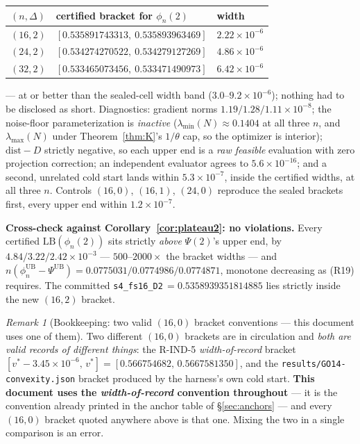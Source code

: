 \documentclass[11pt]{article}
\theoremstyle{definition}
\theoremstyle{remark}
\newtheorem{remark}{Remark}
\begin{document}
\begin{center}
\begin{tabular}{lll}
$(n,\Delta)$ & certified bracket for $\phi_n(2)$ & width\\
\hline
$(16,2)$ & $[0.535891743313,\ 0.535893963469]$ & $2.22\times10^{-6}$\\
$(24,2)$ & $[0.534274270522,\ 0.534279127269]$ & $4.86\times10^{-6}$\\
$(32,2)$ & $[0.533465073456,\ 0.533471490973]$ & $6.42\times10^{-6}$\\
\end{tabular}
\end{center}

\noindent --- at or better than the sealed-cell width band
($3.0$--$9.2\times10^{-6}$); nothing had to be disclosed as short.
Diagnostics: gradient norms $1.19/1.28/1.11\times10^{-8}$; the
noise-floor parameterization is \emph{inactive}
($\lambda_{\min}(N)\approx0.1404$ at all three $n$, and
$\lambda_{\max}(N)$ under Theorem~\ref{thm:K}'s $1/\theta$ cap, so the
optimizer is interior); $\mathrm{dist}-D$ strictly negative, so each
upper end is a \emph{raw feasible} evaluation with zero projection
correction; an independent evaluator agrees to $5.6\times10^{-16}$; and
a second, unrelated cold start lands within $5.3\times10^{-7}$, inside
the certified widths, at all three $n$. Controls $(16,0)$, $(16,1)$,
$(24,0)$ reproduce the sealed brackets first, every upper end within
$1.2\times10^{-7}$.

\medskip\noindent\textbf{Cross-check against
Corollary~\ref{cor:plateau2}: no violations.} Every certified
$\mathrm{LB}(\phi_n(2))$ sits strictly \emph{above} $\Psi(2)$'s upper
end, by $4.84/3.22/2.42\times10^{-3}$ --- $500$--$2000\times$ the
bracket widths --- and
$n(\phi_n^{\mathrm{UB}}-\Psi^{\mathrm{UB}})=0.0775031/0.0774986/
0.0774871$, monotone decreasing as (R19) requires. The committed
\texttt{s4\_fs16\_D2}$\,=0.5358939351814885$ lies strictly inside the
new $(16,2)$ bracket.

\begin{remark}[Bookkeeping: two valid $(16,0)$ bracket conventions ---
this document uses one of them]
\label{rem:bookkeeping}
Two different $(16,0)$ brackets are in circulation and \emph{both are
valid records of different things}: the R-IND-5
\emph{width-of-record} bracket $[v^\ast-3.45\times10^{-6},\,v^\ast]
=[0.566754682,\,0.5667581350]$, and the
\texttt{results/GO14-convexity.json} bracket produced by the harness's
own cold start. \textbf{This document uses the \emph{width-of-record}
convention throughout} --- it is the convention already printed in the
anchor table of \S\ref{sec:anchors} --- and every $(16,0)$ bracket
quoted anywhere above is that one. Mixing the two in a single
comparison is an error.
\end{remark}
\end{document}
